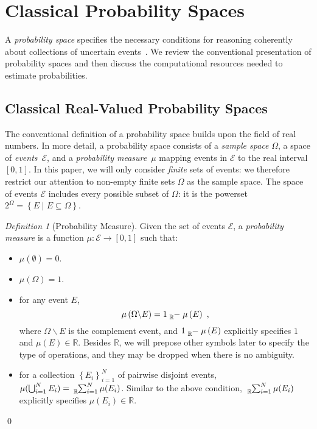 \documentclass{article}
\theoremstyle{remark}
\newtheorem{definition}{Definition}
\newcommand{\events}{\ensuremath{\mathcal{E}}}
\newcommand{\pmeas}{\ensuremath{\mu}}
\begin{document}
\section{Classical Probability Spaces}
  
A \emph{probability space} specifies the necessary conditions for
reasoning coherently about collections of uncertain events~\cite{Kolmogorov1950,Shafer1976,Griffiths2003,Swart2013}.
We review the conventional presentation of probability spaces and
then discuss the computational resources needed to estimate probabilities.



\subsection{Classical Real-Valued Probability Spaces}

The conventional definition of a probability space builds upon the
field of real numbers. In more detail, a probability space consists
of a \emph{sample space} $\Omega$, a space of \emph{events}~$\events$,
and a \emph{probability measure}~$\pmeas$ mapping events in $\events$
to the real interval $[0,1]$. In this paper, we will only consider
\emph{finite} sets of events: we therefore restrict our attention
to non-empty finite sets $\Omega$ as the sample space. The space
of events $\events$ includes every possible subset of $\Omega$:
it is the powerset~$2^{\Omega}=\left\{ E\middle|E\subseteq\Omega\right\} $. 

\begin{definition}[Probability Measure]\label{def:ClassicalProbabilitySpace}
Given the set of events $\events$, a \emph{probability measure} is
a function $\pmeas:\events\rightarrow[0,1]$ such that: 
\begin{itemize}
\item $\pmeas(\emptyset)=0$. 
\item $\pmeas(\Omega)=1$. 
\item for any event $E$, 
\begin{equation}
\pmeas\left(\Omega\backslash E\right)=1\tensor*[_{\mathbb{R}}]{-}{}\pmeas\left(E\right)\textrm{ ,}\label{eq:ClassicalReal-valuedProbability-Complement}
\end{equation}
where $\Omega\backslash E$ is the complement event, and $1\tensor*[_{\mathbb{R}}]{-}{}\pmeas\left(E\right)$
explicitly specifies $1$ and $\pmeas\left(E\right)\in\mathbb{R}$.
Besides $\mathbb{R}$, we will prepose other symbols later to specify
the type of operations, and they may be dropped when there is no ambiguity. 
\item for a collection $\left\{ E_{i}\right\} _{i=1}^{N}$ of pairwise disjoint
events, $\pmeas(\bigcup_{i=1}^{N}E_{i})=\tensor*[_{\mathbb{R}}]{\sum}{_{i=1}^{N}}\pmeas(E_{i})$.
Similar to the above condition, $\tensor*[_{\mathbb{R}}]{\sum}{_{i=1}^{N}}\pmeas(E_{i})$
explicitly specifies $\pmeas(E_{i})\in\mathbb{R}$. 
\end{itemize}
\qed\end{definition}
\end{document}
